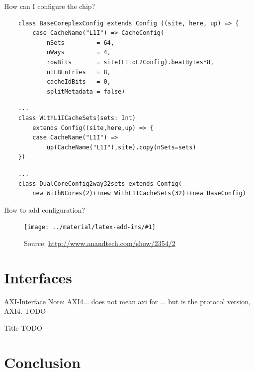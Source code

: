 \documentclass[]{beamer} %
\newcommand{\source}[1]{{\caption{\tiny {\fontspec{ProFontWindows} {Source: #1} } } } }
\newcommand*{\COMPILEIMAGES}{}%
\newcommand\inputimage[1]{%
	\ifdefined\COMPILEIMAGES
		
	\else
		\texttt{[image: ../material/latex-add-ins/\#1]}
	\fi
	}
\begin{document}
\begin{frame}[fragile]{How can I configure the chip?}
	\begin{verbatim}
	class BaseCoreplexConfig extends Config ((site, here, up) => {
		case CacheName("L1I") => CacheConfig(
			nSets         = 64,
			nWays         = 4,
			rowBits       = site(L1toL2Config).beatBytes*8,
			nTLBEntries   = 8,
			cacheIdBits   = 0,
			splitMetadata = false)
	\end{verbatim}
	\pause
	\begin{verbatim}
	...
	class WithL1ICacheSets(sets: Int)
		extends Config((site,here,up) => {
		case CacheName("L1I") =>
			up(CacheName("L1I"),site).copy(nSets=sets)
	})
	\end{verbatim}
	\pause
	\begin{verbatim}
	...
	class DualCoreConfig2way32sets extends Config(
		new WithNCores(2)++new WithL1ICacheSets(32)++new BaseConfig)
	\end{verbatim}
\end{frame}


\begin{frame}{How to add configuration?}
	\begin{figure}
		\centering
		\inputimage{image1}
		\source{\url{http://www.anandtech.com/show/2354/2}}
	\end{figure}
\end{frame}



\section{Interfaces}

\begin{frame}{AXI-Interface}
	Note: AXI4... does not mean axi for ... but is the protocol version, AXI4.
	TODO
\end{frame}

\begin{frame}{Title}
	TODO
\end{frame}



\section[Conclusion]{Conclusion}
\end{document}
